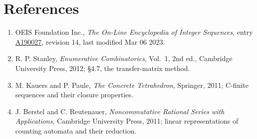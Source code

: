 \documentclass[11pt]{article}
\theoremstyle{definition}
\begin{document}
\section{References}

\begin{enumerate}

\item OEIS Foundation Inc., \emph{The On-Line Encyclopedia of Integer Sequences}, entry \href{https://oeis.org/A190027}{A190027}, revision 14, last modified Mar 06 2023.

\item R. P. Stanley, \emph{Enumerative Combinatorics}, Vol.~1, 2nd ed., Cambridge University Press, 2012; \S4.7, the transfer-matrix method.

\item M. Kauers and P. Paule, \emph{The Concrete Tetrahedron}, Springer, 2011; C-finite sequences and their closure properties.

\item J. Berstel and C. Reutenauer, \emph{Noncommutative Rational Series with Applications}, Cambridge University Press, 2011; linear representations of counting automata and their reduction.

\end{enumerate}
\end{document}
